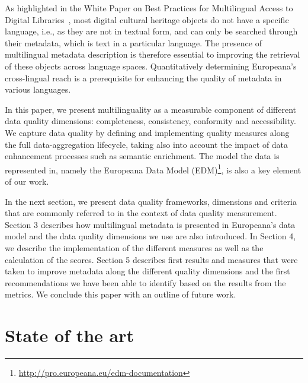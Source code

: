 As highlighted in the White Paper on Best Practices for Multilingual Access to Digital Libraries~\cite{stiller2016}, most digital cultural heritage objects do not have a specific language, i.e., as they are not in textual form, and can only be searched through their metadata, which is text in a particular language. The presence of multilingual metadata description is therefore essential to improving the retrieval of these objects across language spaces. Quantitatively determining Europeana's cross-lingual reach is a prerequisite for enhancing the quality of metadata in various languages.


In this paper, we present multilinguality as a 
measurable component of different data quality dimensions: completeness, consistency, conformity and accessibility. We capture data quality by defining and implementing quality measures along the full data-aggregation lifecycle, taking also into account the impact of data enhancement processes such as semantic enrichment. The model the data is represented in, namely the Europeana Data Model (EDM)\footnote{\url{http://pro.europeana.eu/edm-documentation}}, is also a key element of our work. 

In the next section, we present data quality frameworks, dimensions and criteria that are commonly referred to in the context of data quality measurement. Section 3 describes how multilingual metadata is presented in Europeana's data model and the data quality dimensions we use are also introduced. In Section 4, we describe the implementation of the different measures as well as the calculation of the scores. Section 5 describes first results and measures that were taken to improve metadata along the different quality dimensions and the first recommendations we have been able to identify based on the results from the metrics. We conclude this paper with an outline of future work. 

\section{State of the art}

